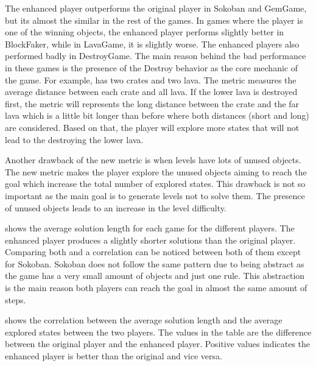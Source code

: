 The enhanced player outperforms the original player in Sokoban and GemGame, but its almost the similar in the rest of the games. In games where the player is one of the winning objects, the enhanced player performs slightly better in BlockFaker, while in LavaGame, it is slightly worse. The enhanced players also performed badly in DestroyGame. The main reason behind the bad performance in these games is the presence of the Destroy behavior as the core mechanic of the game. For example,  has two crates and two lava. The metric measures the average distance between each crate and all lava. If the lower lava is destroyed first, the metric will represents the long distance between the crate and the far lava which is a little bit longer than before where both distances (short and long) are considered. Based on that, the player will explore more states that will not lead to the destroying the lower lava.


Another drawback of the new metric is when levels have lots of unused objects. The new metric makes the player explore the unused objects aiming to reach the goal which increase the total number of explored states. This drawback is not so important as the main goal is to generate levels not to solve them. The presence of unused objects leads to an increase in the level difficulty.\\\par

 shows the average solution length for each game for the different players. The enhanced player produces  a slightly shorter solutions than the original player. Comparing both  and  a correlation can be noticed between both of them except for Sokoban. Sokoban does not follow the same pattern due to being abstract as the game has a very small amount of objects and just one rule. This abstraction is the main reason both players can reach the goal in almost the same amount of steps.


 shows the correlation between the average solution length and the average explored states between the two players. The values in the table are the difference between the original player and the enhanced player. Positive values indicates the enhanced player is better than the original and vice versa.

